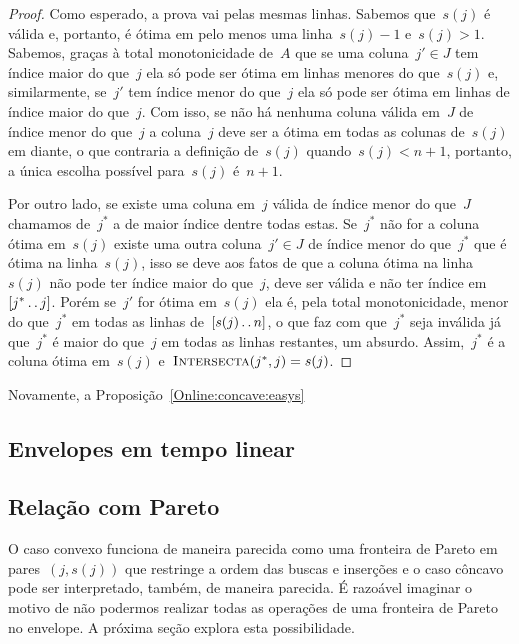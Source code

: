 \begin{proof}
Como esperado, a prova vai pelas mesmas linhas. Sabemos que~$s(j)$ é válida e, portanto, é ótima em pelo menos uma linha~$s(j) - 1$ e~$s(j) > 1$. Sabemos, graças à total monotonicidade de~$A$ que se uma coluna~$j' \in J$ tem índice maior do que~$j$ ela só pode ser ótima em linhas menores do que~$s(j)$ e, similarmente, se~$j'$ tem índice menor do que~$j$ ela só pode ser ótima em linhas de índice maior do que~$j$. Com isso, se não há nenhuma coluna válida em~$J$ de índice menor do que~$j$ a coluna~$j$ deve ser a ótima em todas as colunas de~$s(j)$ em diante, o que contraria a definição de~$s(j)$ quando~$s(j) < n+1$, portanto, a única escolha possível para~$s(j)$ é~$n+1$.

Por outro lado, se existe uma coluna em~$j$ válida de índice menor do que~$J$ chamamos de~$j^*$ a de maior índice dentre todas estas. Se~$j^*$ não for a coluna ótima em~$s(j)$ existe uma outra coluna~$j' \in J$ de índice menor do que~$j^*$ que é ótima na linha~$s(j)$, isso se deve aos fatos de que a coluna ótima na linha~$s(j)$ não pode ter índice maior do que~$j$, deve ser válida e não ter índice em~$[j^* \,.\,.\, j]$. Porém se~$j'$ for ótima em~$s(j)$ ela é, pela total monotonicidade, menor do que~$j^*$ em todas as linhas de~$[s(j) \,.\,.\, n]$, o que faz com que~$j^*$ seja inválida já que~$j^*$ é maior do que~$j$ em todas as linhas restantes, um absurdo. Assim,~$j^*$ é a coluna ótima em~$s(j)$ e~$\textsc{Intersecta}(j^*,j) = s(j)$.
\end{proof}

Novamente, a Proposição~\ref{Online:concave:easys}


\subsection{Envelopes em tempo linear} \label{Online:linear}


\subsection{Relação com Pareto}

O caso convexo funciona de maneira parecida como uma fronteira de Pareto em pares~$(j,s(j))$ que restringe a ordem das buscas e inserções e o caso côncavo pode ser interpretado, também, de maneira parecida. É razoável imaginar o motivo de não podermos realizar todas as operações de uma fronteira de Pareto no envelope. A próxima seção explora esta possibilidade.
